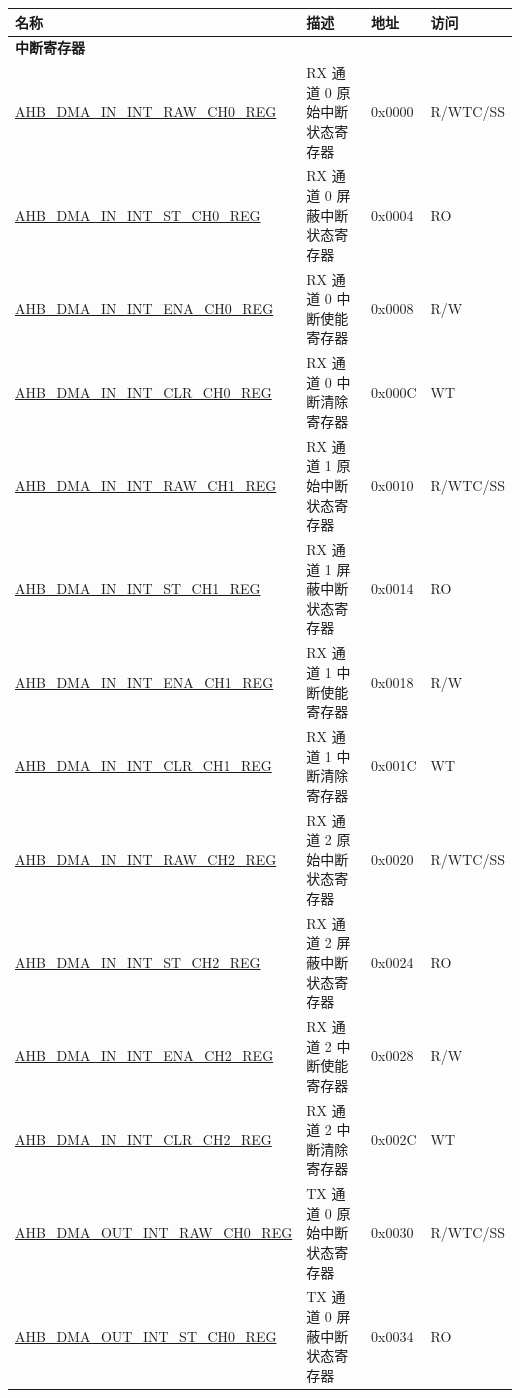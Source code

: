 \begin{longtable}{ | p{8cm} | p{8cm} | p{1.3cm} | p{1.5cm} | }
\hline\rowcolor{lightgray}
\textbf{名称} & \textbf{描述} &  \textbf{地址} & \textbf{访问} \\ \hline
\endhead
\multicolumn{4}{|l|}{\textbf{中断寄存器}} \\ \hline
\hyperref[regdesc:AHBDMAININTRAWCHNREG]{AHB\_DMA\_IN\_INT\_RAW\_CH0\_REG} & RX 通道 0 原始中断状态寄存器 & 0x0000 & R/WTC/SS \\ \hline
\hyperref[regdesc:AHBDMAININTSTCHNREG]{AHB\_DMA\_IN\_INT\_ST\_CH0\_REG} & RX 通道 0 屏蔽中断状态寄存器 & 0x0004 & RO \\ \hline
\hyperref[regdesc:AHBDMAININTENACHNREG]{AHB\_DMA\_IN\_INT\_ENA\_CH0\_REG} & RX 通道 0 中断使能寄存器 & 0x0008 & R/W \\ \hline
\hyperref[regdesc:AHBDMAININTCLRCHNREG]{AHB\_DMA\_IN\_INT\_CLR\_CH0\_REG} & RX 通道 0 中断清除寄存器 & 0x000C & WT \\ \hline
\hyperref[regdesc:AHBDMAININTRAWCHNREG]{AHB\_DMA\_IN\_INT\_RAW\_CH1\_REG} & RX 通道 1 原始中断状态寄存器 & 0x0010 & R/WTC/SS \\ \hline
\hyperref[regdesc:AHBDMAININTSTCHNREG]{AHB\_DMA\_IN\_INT\_ST\_CH1\_REG} & RX 通道 1 屏蔽中断状态寄存器 & 0x0014 & RO \\ \hline
\hyperref[regdesc:AHBDMAININTENACHNREG]{AHB\_DMA\_IN\_INT\_ENA\_CH1\_REG} & RX 通道 1 中断使能寄存器 & 0x0018 & R/W \\ \hline
\hyperref[regdesc:AHBDMAININTCLRCHNREG]{AHB\_DMA\_IN\_INT\_CLR\_CH1\_REG} & RX 通道 1 中断清除寄存器 & 0x001C & WT \\ \hline
\hyperref[regdesc:AHBDMAININTRAWCHNREG]{AHB\_DMA\_IN\_INT\_RAW\_CH2\_REG} & RX 通道 2 原始中断状态寄存器 & 0x0020 & R/WTC/SS \\ \hline
\hyperref[regdesc:AHBDMAININTSTCHNREG]{AHB\_DMA\_IN\_INT\_ST\_CH2\_REG} & RX 通道 2 屏蔽中断状态寄存器 & 0x0024 & RO \\ \hline
\hyperref[regdesc:AHBDMAININTENACHNREG]{AHB\_DMA\_IN\_INT\_ENA\_CH2\_REG} & RX 通道 2 中断使能寄存器 & 0x0028 & R/W \\ \hline
\hyperref[regdesc:AHBDMAININTCLRCHNREG]{AHB\_DMA\_IN\_INT\_CLR\_CH2\_REG} & RX 通道 2 中断清除寄存器 & 0x002C & WT \\ \hline
\hyperref[regdesc:AHBDMAOUTINTRAWCHNREG]{AHB\_DMA\_OUT\_INT\_RAW\_CH0\_REG} & TX 通道 0 原始中断状态寄存器 & 0x0030 & R/WTC/SS \\ \hline
\hyperref[regdesc:AHBDMAOUTINTSTCHNREG]{AHB\_DMA\_OUT\_INT\_ST\_CH0\_REG} & TX 通道 0 屏蔽中断状态寄存器 & 0x0034 & RO \\ \hline

\end{longtable}
